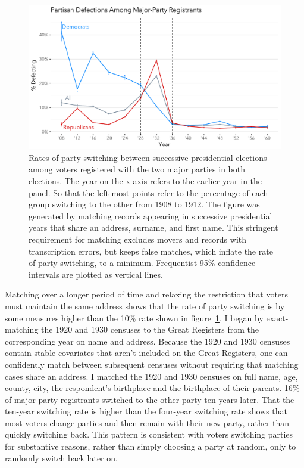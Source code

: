 \documentclass[11pt]{scrartcl}\usepackage[]{graphicx}\usepackage[]{color}
\makeatletter
\def\maxwidth{ %
  \ifdim\Gin@nat@width>\linewidth
    \linewidth
  \else
    \Gin@nat@width
  \fi
}
\newenvironment{knitrout}{}{} %
\makeatother
\begin{document}
\begin{knitrout}
\color{fgcolor}\begin{figure}

{\centering \includegraphics[width=\maxwidth]{figures/plots-pid_switching-1} 

}

\caption[Rates of party switching between successive presidential elections among voters registered with the two major parties in both elections]{Rates of party switching between successive presidential elections among voters registered with the two major parties in both elections. The year on the x-axis refers to the earlier year in the panel. So that the left-most points refer to the percentage of each group switching to the other from 1908 to 1912. The figure was generated by matching records appearing in successive presidential years that share an address, surname, and first name. This stringent requirement for matching excludes movers and records with transcription errors, but keeps false matches, which inflate the rate of party-switching, to a minimum. Frequentist 95\% confidence intervals are plotted as vertical lines.}\label{fig:pid_switching}
\end{figure}


\end{knitrout}
 

Matching over a longer period of time and relaxing the restriction that voters must maintain the same address shows that the rate of party switching is by some measures higher than the 10\% rate shown in figure~\ref{fig:pid_switching}. I began by exact-matching the 1920 and 1930 censuses to the Great Registers from the corresponding year on name and address. Because the 1920 and 1930 censuses contain stable covariates that aren't included on the Great Registers, one can confidently match between subsequent censuses without requiring that matching cases share an address.  I matched the 1920 and 1930 censuses on full name, age, county, city, the respondent's birthplace and the birthplace of their parents. 16\% of major-party registrants switched to the other party ten years later. That the ten-year switching rate is higher than the four-year switching rate shows that most voters change parties and then remain with their new party, rather than quickly switching back. This pattern is consistent with voters switching parties for substantive reasons, rather than simply choosing a party at random, only to randomly switch back later on.
\end{document}
